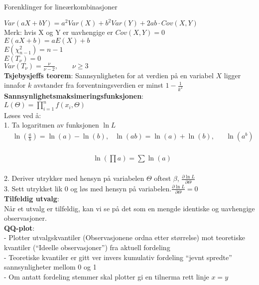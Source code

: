 \documentclass[final,hyperref={pdfpagelabels=false}]{beamer}
\newcommand{\maths}[1]{\vspace{-3mm}\begin{align*}#1\end{align*}\\\vspace{-3mm}}
\newcommand{\body}[1]{\footnotesize\raggedright{#1}\par}
\newcommand{\subsect}[1]{\center\normalsize{#1}\\}
\begin{document}
\begin{frame}{} 
	\begin{columns}[t]
		\begin{column}{.33\linewidth}
			\begin{block}{}
				\subsect{Forenklinger for lineærkombinasjoner}
				\body{\footnotesize\raggedright
					$Var(aX+bY)=a^2Var(X)+b^2Var(Y)+2ab\cdot Cov(X,Y)$\\
					Merk: hvis X og Y er uavhengige er $Cov(X,Y)=0$\\
					$E(aX+b)=aE(X)+b$\\
					$E(\chi^2_{n-1})=n-1$\\
					$E(T_\nu)=0$\\
					$Var(T_\nu)=\frac \nu {\nu - 2}, \qquad \nu \geq 3$\\
					\textbf{Tsjebysjeffs teorem}: Sannsynligheten for at verdien på en variabel $X$ ligger innafor $k$ avstander fra forventningsverdien er minst $1-\frac{1}{k^2}$\\
					\textbf{Sannsynlighetsmaksimeringsfunksjonen}:\\
					$L(\Theta)=\prod_{i=1}^n f(x_i,\Theta)$\\
					Løses ved å:\\
					1. Ta logaritmen av funksjonen $\ln L$\\\vspace{-2mm}
					\maths{&\ln\left(\frac{a}{b}\right)=\ln(a)-\ln(b),&\ln(ab)=\ln(a)+\ln(b),& &\ln(a^b)=b\ln (a)}\vspace{-3mm}
					\maths{&\ln\left(\prod a\right)=\sum\ln(a)}
					2. Deriver utrykker med hensyn på variabelen $\Theta$ oftest $\beta$, $\frac{\partial\ln L}{\partial \Theta}$\\
					3. Sett utrykket lik $0$ og løs med hensyn på variabelen.$\frac{\partial\ln L}{\partial \Theta}=0$\\
					\textbf{Tilfeldig utvalg}:\\
					Når et utvalg er tilfeldig, kan vi se på det som en mengde identiske og uavhengige observasjoner.\\
					\textbf{QQ-plot}:\\
					- Plotter utvalgskvantiler (Observasjonene ordna etter størrelse) mot teoretiske kvantiler (``Ideelle observasjoner'') fra aktuell fordeling\\
					- Teoretiske kvantiler er gitt ver invers kumulativ fordeling ``jevnt spredte'' sannsynligheter mellom 0 og 1\\
					- Om antatt fordeling stemmer skal plotter gi en tilnerma rett linje $x=y$\\
}
\end{block}
\end{column}
\end{columns}
\end{frame}
\end{document}
